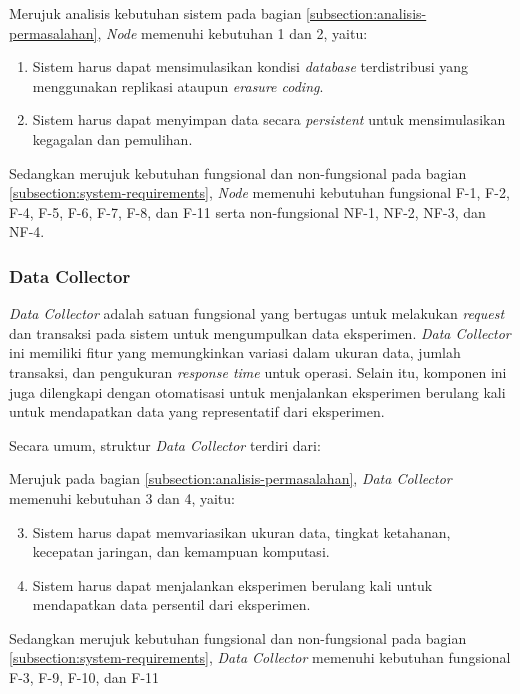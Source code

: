 Merujuk analisis kebutuhan sistem pada bagian \ref{subsection:analisis-permasalahan}, \textit{Node} memenuhi kebutuhan 1 dan 2, yaitu:

\begin{enumerate}
    \item Sistem harus dapat mensimulasikan kondisi \textit{database} terdistribusi yang menggunakan replikasi ataupun \textit{erasure coding}.
    \item Sistem harus dapat menyimpan data secara \textit{persistent} untuk mensimulasikan kegagalan dan pemulihan.
\end{enumerate}

Sedangkan merujuk kebutuhan fungsional dan non-fungsional pada bagian \ref{subsection:system-requirements}, \textit{Node} memenuhi kebutuhan fungsional F-1, F-2, F-4, F-5, F-6, F-7, F-8, dan F-11 serta non-fungsional NF-1, NF-2, NF-3, dan NF-4.

\subsubsection{Data Collector}
\label{subsubsection:data-collector}

\textit{Data Collector} adalah satuan fungsional yang bertugas untuk melakukan \textit{request} dan transaksi pada sistem untuk mengumpulkan data eksperimen. \textit{Data Collector} ini memiliki fitur yang memungkinkan variasi dalam ukuran data, jumlah transaksi, dan pengukuran \textit{response time} untuk operasi. Selain itu, komponen ini juga dilengkapi dengan otomatisasi untuk menjalankan eksperimen berulang kali untuk mendapatkan data yang representatif dari eksperimen.

Secara umum, struktur \textit{Data Collector} terdiri dari:


Merujuk pada bagian \ref{subsection:analisis-permasalahan}, \textit{Data Collector} memenuhi kebutuhan 3 dan 4, yaitu:

\begin{enumerate}
    \setcounter{enumi}{2}
    \item Sistem harus dapat memvariasikan ukuran data, tingkat ketahanan, kecepatan jaringan, dan kemampuan komputasi.
    \item Sistem harus dapat menjalankan eksperimen berulang kali untuk mendapatkan data persentil dari eksperimen.
\end{enumerate}

Sedangkan merujuk kebutuhan fungsional dan non-fungsional pada bagian \ref{subsection:system-requirements}, \textit{Data Collector} memenuhi kebutuhan fungsional F-3, F-9, F-10, dan F-11
